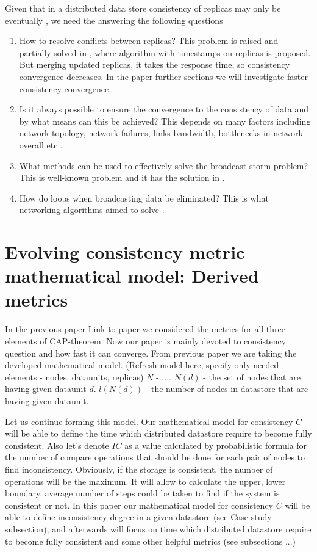 \documentclass{llncs}
\begin{document}
Given that in a distributed data store consistency of replicas may only be eventually \cite[{\color{red} you need to refer to the corresponding papers}]{?}, we need the answering the following questions
\begin{enumerate}
\item
How to resolve conflicts between replicas?
This problem is raised and partially solved in \cite{bib:c_ts}, where algorithm with timestamps on replicas is proposed.
But merging updated replicas, it takes the response time, so consistency convergence decreases.
In the paper further sections we will investigate faster consistency convergence.
\item
Is it always possible to ensure the convergence to the consistency of data and by what means can this be achieved?
This depends on many factors including network topology,
network failures, links bandwidth, bottlenecks in network overall etc \cite[{\color{red} links are needed}]{?}.
\item
What methods can be used to effectively solve the broadcast storm problem?
This is well-known problem and it has the solution in \cite[{\color{red} links are needed}]{?}.
\item How do loops when broadcasting data be eliminated?
This is what networking algorithms aimed to solve \cite[{\color{red} links are needed}]{?}.
\end{enumerate}

\section{Evolving consistency metric mathematical model: Derived metrics}

In the previous paper {\color{red} Link to paper} we considered the metrics for all three elements of CAP-theorem.
Now our paper is mainly devoted to consistency question and how fast it can converge.
From previous paper we are taking the developed mathematical model.
(Refresh model here, specify only needed elements - nodes, dataunits, replicas)
$N$ - ....
$N(d)$ - the set of nodes that are having given dataunit $d$.
$l(N(d))$ - the number of nodes in datastore that are having given dataunit.

Let us continue forming this model.
Our mathematical model for consistency $C$ will be able to define the time which distributed datastore require
to become fully consistent. Also let's denote  $IC$ as a value calculated by probabilistic formula for the number of compare operations that should be done for each pair of nodes to find inconsistency.
Obviously, if the storage is consistent, the number of operations will be the maximum. It will allow to calculate the upper, lower boundary, average number of steps could be taken to find if the system is consistent or not.
In this paper our mathematical model for consistency $C$ will be able to define inconsistency degree in a given datastore (see Case study subsection), and afterwards will focus on time which distributed datastore require to become fully consistent and some other helpful metrics (see subsections ...)
\end{document}
